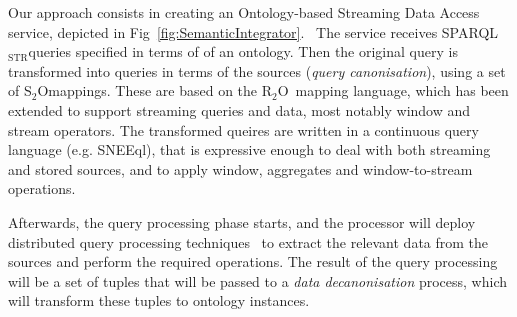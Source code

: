 \documentclass[runningheads,a4paper]{llncs}
\newcommand{\subscript}[1]{\ensuremath{_{\textrm{#1}}}}
\newcommand{\rtwoo}{\textsf{R\subscript{2}O}}
\newcommand{\stwoo}{\textsf{S\subscript{2}O}}
\newcommand{\sparqlstr}{SPARQL\subscript{STR}}
\begin{document}
Our approach consists in creating an Ontology-based Streaming Data Access service, depicted in Fig~\ref{fig:SemanticIntegrator}.\ %
The service receives \sparqlstr queries specified in terms of 
of an ontology.
Then the original query is transformed into queries in terms of the sources (\textit{query canonisation}), using 
a set of \stwoo mappings. These are based on the \rtwoo\ mapping language, which has been extended to support  streaming queries and data, most notably window and stream operators. 
The transformed queires are written in a continuous query language (e.g. SNEEql), that is expressive enough to deal with both streaming and stored sources, and to apply window, aggregates and window-to-stream operations.

Afterwards, the query processing phase starts, and the processor will deploy distributed query processing techniques~\cite{Kossmann_00} to extract the relevant data from the sources and perform the required operations.
%
The result of the query processing will be a set of tuples that will be passed to a \textit{data decanonisation} process, which will transform these tuples to ontology instances.

\end{document}
